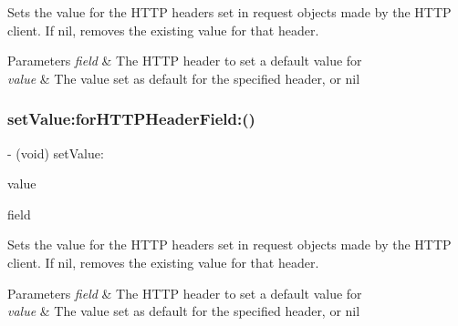 Sets the value for the H\+T\+TP headers set in request objects made by the H\+T\+TP client. If {\ttfamily nil}, removes the existing value for that header.


\begin{DoxyParams}{Parameters}
{\em field} & The H\+T\+TP header to set a default value for \\
\hline
{\em value} & The value set as default for the specified header, or {\ttfamily nil} \\
\hline
\end{DoxyParams}
\mbox{\label{interface_a_f_h_t_t_p_request_serializer_a782d460accdab9c8682550a77f167898}} 
\subsubsection{\texorpdfstring{set\+Value\+:for\+H\+T\+T\+P\+Header\+Field\+:()}{setValue:forHTTPHeaderField:()}\hspace{0.1cm}{\footnotesize\ttfamily [3/3]}}
{\footnotesize\ttfamily -\/ (void) set\+Value\+: \begin{DoxyParamCaption}\item[{(nullable N\+S\+String $\ast$)}]{value }\item[{forHTTPHeaderField:(N\+S\+String $\ast$)}]{field }\end{DoxyParamCaption}}

Sets the value for the H\+T\+TP headers set in request objects made by the H\+T\+TP client. If {\ttfamily nil}, removes the existing value for that header.


\begin{DoxyParams}{Parameters}
{\em field} & The H\+T\+TP header to set a default value for \\
\hline
{\em value} & The value set as default for the specified header, or {\ttfamily nil} \\
\hline
\end{DoxyParams}
\mbox{\label{interface_a_f_h_t_t_p_request_serializer_a11dac7e7ab325f1e937c717f8c4e25b4}} 
